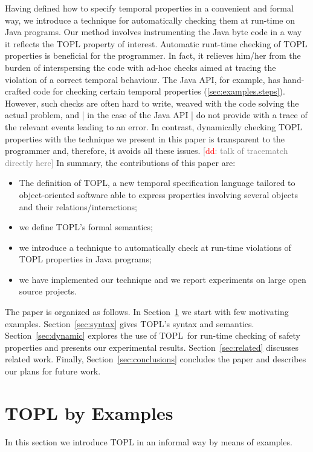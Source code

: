 \documentclass{llncs} %
\newcommand{\TPL}{TOPL}
\newcommand{\noterg}[2]{\textcolor{gray}{[\textcolor{red}{#1}: #2]}}
\newcommand{\dd}[1]{\noterg{dd}{#1}}
\newcommand{\dinocomment}[1]{\dd{#1}}
\begin{document}
Having defined how to specify temporal properties in a convenient  and formal way, 
we introduce a technique for automatically checking them at run-time on Java programs.
Our method involves instrumenting the Java byte code in a way it reflects the TOPL property of interest.
Automatic runt-time checking of TOPL properties is beneficial for the programmer. 
In fact, it relieves him/her from the burden of 
interspersing the code with ad-hoc checks  aimed at tracing the violation of a correct temporal behaviour.
The Java API, for example, has hand-crafted code for checking certain temporal properties (\autoref{sec:examples.steps}).
However, such checks are often hard to write, weaved with the code solving the actual problem, and | in the case of the Java API |  do not provide with a trace of the relevant events leading to an error.
In contrast, dynamically checking TOPL properties  with the technique we present in this paper is transparent to the programmer and, therefore,  it avoids all these issues.
\dinocomment{talk of tracematch directly here}
In summary, the contributions of this paper are:
\begin{itemize}
\item The definition of TOPL, a new temporal specification language tailored to object-oriented software able to express properties involving several objects and their relations/interactions;
\item we define TOPL's formal semantics;
\item we introduce a technique to automatically check at run-time violations of TOPL properties in Java programs;
\item we have implemented our technique and we report experiments on large open source projects.
\end{itemize}

The paper is organized as follows. In Section~\ref{sec:examples} we start with few motivating examples.
Section~\ref{sec:syntax} gives  \TPL's syntax  and semantics.
Section~\ref{sec:dynamic} explores the use of \TPL \ for run-time checking of safety properties and presents our experimental results. Section~\ref{sec:related} discusses related work.
Finally, Section~\ref{sec:conclusions} concludes the paper and describes our plans for future work.




\section{TOPL by Examples} \label{sec:examples} %
In this section we introduce TOPL in an informal way by means of examples.
\end{document}
